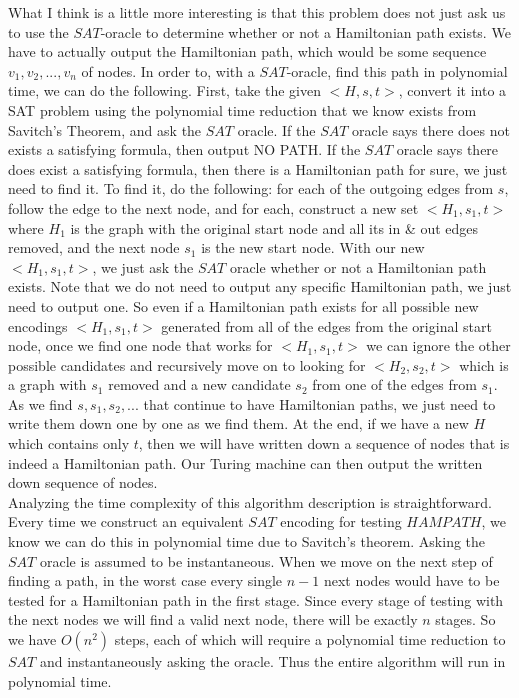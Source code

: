 \documentclass[paper=a4, fontsize=11pt]{scrartcl} %
\numberwithin{equation}{section} %
\numberwithin{figure}{section} %
\numberwithin{table}{section} %
\begin{document}
What I think is a little more interesting is that this problem does not just ask us to use the $SAT$-oracle to determine whether or not a Hamiltonian path exists.  We have to actually output the Hamiltonian path, which would be some sequence $v_1, v_2, ..., v_n$ of nodes.  In order to, with a $SAT$-oracle, find this path in polynomial time, we can do the following.  First, take the given $<H,s,t>$, convert it into a SAT problem using the polynomial time reduction that we know exists from Savitch's Theorem, and ask the $SAT$ oracle.  If the $SAT$ oracle says there does not exists a satisfying formula, then output NO PATH.  If the $SAT$ oracle says there does exist a satisfying formula, then there is a Hamiltonian path for sure, we just need to find it.  To find it, do the following: for each of the outgoing edges from $s$, follow the edge to the next node, and for each, construct a new set $<H_1, s_1, t>$ where $H_1$ is the graph with the original start node and all its in \& out edges removed, and the next node $s_1$ is the new start node.  With our new $<H_1, s_1, t>$, we just ask the $SAT$ oracle whether or not a Hamiltonian path exists.  Note that we do not need to output any specific Hamiltonian path, we just need to output one.  So even if a Hamiltonian path exists for all possible new encodings $<H_1, s_1, t>$ generated from all of the edges from the original start node, once we find one node that works for $<H_1, s_1, t>$ we can ignore the other possible candidates and recursively move on to looking for $<H_2, s_2, t>$ which is a graph with $s_1$ removed and a new candidate $s_2$ from one of the edges from $s_1$.  As we find $s, s_1, s_2, ...$ that continue to have Hamiltonian paths, we just need to write them down one by one as we find them.  At the end, if we have a new $H$ which contains only $t$, then we will have written down a sequence of nodes that is indeed a Hamiltonian path.  Our Turing machine can then output the written down sequence of nodes.\\

Analyzing the time complexity of this algorithm description is straightforward.  Every time we construct an equivalent $SAT$ encoding for testing $HAMPATH$, we know we can do this in polynomial time due to Savitch's theorem.  Asking the $SAT$ oracle is assumed to be instantaneous.  When we move on the next step of finding a path, in the worst case every single $n-1$ next nodes would have to be tested for a Hamiltonian path in the first stage.  Since every stage of testing with the next nodes we will find a valid next node, there will be exactly $n$ stages.  So we have $O(n^2)$ steps, each of which will require a polynomial time reduction to $SAT$ and instantaneously asking the oracle.  Thus the entire algorithm will run in polynomial time.











\end{document}
